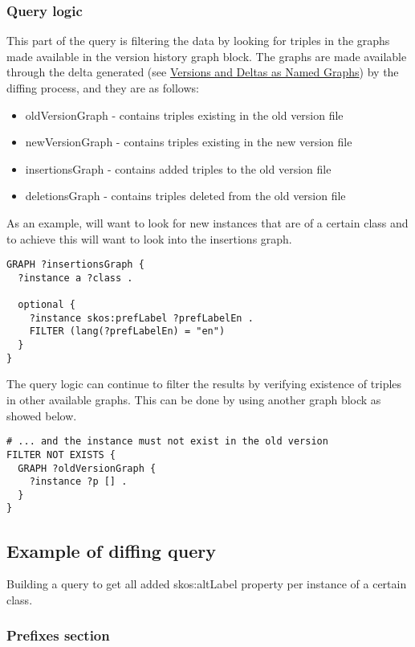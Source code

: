 \subsubsection{Query logic}
This part of the query is filtering the data by looking for triples in the graphs made available in the version history graph block. The graphs are made available through the delta generated (see \hyperlink{https://github.com/jneubert/skos-history/wiki/Versions-and-Deltas-as-Named-Graphs}{Versions and Deltas as Named Graphs}) by the diffing process, and they are as follows:

\begin{itemize}
  \item oldVersionGraph - contains triples existing in the old version file
  \item newVersionGraph - contains triples existing in the new version file
  \item insertionsGraph - contains added triples to the old version file
  \item deletionsGraph - contains triples deleted from the old version file
\end{itemize}

As an example, will want to look for new instances that are of a certain class and to achieve this will want to look into the insertions graph.

\begin{lstlisting}
GRAPH ?insertionsGraph {
  ?instance a ?class .

  optional {
    ?instance skos:prefLabel ?prefLabelEn .
    FILTER (lang(?prefLabelEn) = "en")
  }
}
\end{lstlisting}

The query logic can continue to filter the results by verifying existence of triples in other available graphs. This can be done by using another graph block as showed below.

\begin{lstlisting}
# ... and the instance must not exist in the old version
FILTER NOT EXISTS {
  GRAPH ?oldVersionGraph {
    ?instance ?p [] .
  }
}
\end{lstlisting}

\subsection{Example of diffing query}
Building a query to get all added skos:altLabel property per instance of a certain class.

\subsubsection{Prefixes section}

